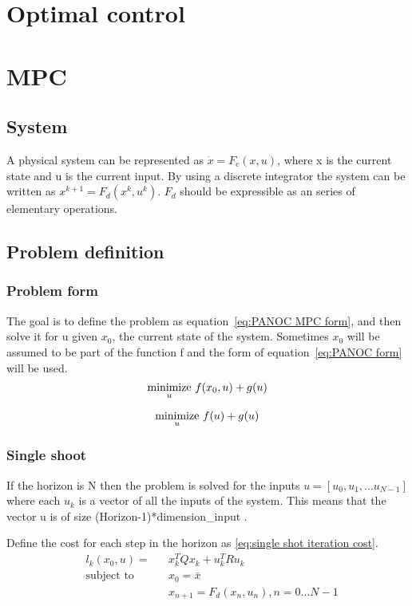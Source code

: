 \section{Optimal control}

\section{MPC}
	\subsection{System}
		A physical system can be represented as $\dot{x}=F_c(x,u)$, where x is the current state and u is the current input. By using a discrete integrator the system can be written as $x^{k+1}=F_d(x^{k},u^{k})$. $F_d$ should be expressible as an series of elementary operations.
	\subsection{Problem definition}
		\subsubsection{Problem form}
			The goal is to define the problem as equation~\ref{eq:PANOC MPC form}, and then solve it for u given $x_0$, the current state of the system. Sometimes $x_0$ will be assumed to be part of the function f and the form of equation~\ref{eq:PANOC form} will be used.
			\begin{equation}
				\underset{u}{\operatorname*{minimize}} \  f(x_0,u) + g(u)
				\label{eq:PANOC MPC form}
			\end{equation}
			
			\begin{equation}
				\underset{u}{\operatorname*{minimize}} \  f(u) + g(u)
				\label{eq:PANOC form}
			\end{equation}
		\subsubsection{Single shoot}
			If the horizon is N then the problem is solved for the inputs $u=[u_0,u_1,... u_{N-1}]$ where each $u_k$ is a vector of all the inputs of the system. This means that the vector u is of size (Horizon-1)*dimension\_input .
			
			Define the cost for each step in the horizon as \ref{eq:single shot iteration cost}.
			\begin{equation}
				\begin{aligned}
				& l_k(x_0,u) = &&  x_k^T Q x_k  +  u_k^T R u_k \\
				& \text{subject to}			&& x_0 = \bar{x} \\
				& 							&&  x_{n+1} = F_d(x_n,u_n), n=0...N-1
				\end{aligned}
				\label{eq:single shot iteration cost}
			\end{equation}
			
